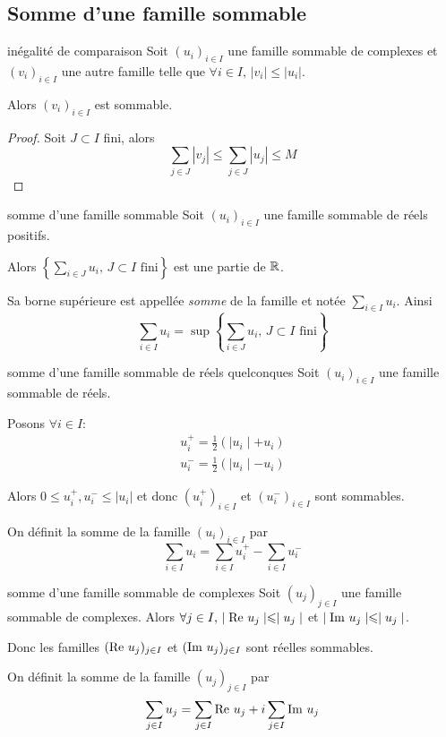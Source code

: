 \subsection{Somme d'une famille sommable }

\begin{proposition}{inégalité de comparaison}{}
    Soit $(u_i)_{i \in I}$ une famille sommable de complexes et $(v_i)_{i \in I}$
    une autre famille telle que $\forall i \in I, \, |v_i| \leqslant |u_i|$.

    Alors $(v_i)_{i \in I}$ est sommable.
\end{proposition}

\begin{proof}
    Soit $J \subset I$ fini, alors
    $$\sum_{j \in J} |v_j| \leqslant \sum_{j \in J} |u_j| \leqslant M$$
\end{proof}


\begin{definition}{somme d'une famille sommable}{}
    Soit $(u_i)_{i \in I}$ une famille sommable de réels positifs. 

    Alors $\displaystyle \left\{ \sum_{i \in J} u_i, \, J \subset I \text{ fini}  \right\}$ est une partie 
    de $\mathbb{R}$. 

    Sa borne supérieure est appellée \emph{somme} de la famille et notée $\displaystyle \sum_{i \in I} u_i$.
    Ainsi $$\sum_{i \in I} u_i = \sup \left\{ \sum_{i \in J} u_i, \, J \subset I \text{ fini}  \right\}$$
\end{definition}

\begin{theoreme}{somme d'une famille sommable de réels quelconques}{}
    Soit $(u_i)_{i \in I}$ une famille sommable de réels. 

    Posons $\forall i \in I : $ 
    \begin{align*}
        u_i^+ = \frac 1 2 (\mid u_i \mid + u_i)\\
        u_i^- = \frac 1 2 (\mid u_i \mid - u_i)
    \end{align*}

    Alors $0 \leqslant u_i^+, u_i^- \leqslant |u_i|$ et donc $(u_i^+)_{i \in I}$ et $(u_i^-)_{i \in I}$ sont sommables.

    On définit la somme de la famille $(u_i)_{i \in I}$ par
    $$\sum_{i \in I} u_i = \sum_{i \in I} u_i^+ - \sum_{i \in I} u_i^-$$
\end{theoreme}

\begin{theoreme}{somme d'une famille sommable de complexes}{}
    Soit $(u_j)_{j \in I}$ une famille sommable de complexes. Alors
    $\forall j \in I, \, \mid \operatorname{Re} \, u_j \mid \leqslant \mid u_j \mid$ et $\mid \operatorname{Im} \, u_j \mid \leqslant \mid u_j \mid$.

    Donc les familles $(\operatorname{Re} \, u_j)_{j \in I}$ et $(\operatorname{Im} \, u_j)_{j \in I}$ sont réelles sommables.

    On définit la somme de la famille $(u_j)_{j \in I}$ par
    $$\sum_{j \in I} u_j = \sum_{j \in I} \operatorname{Re} \, u_j + i \sum_{j \in I} \operatorname{Im} \, u_j$$

\end{theoreme}


